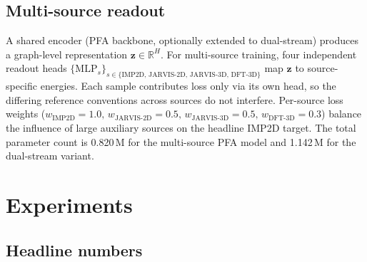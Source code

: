 \documentclass[11pt,a4paper]{article}
\begin{document}
\subsection{Multi-source readout}
A shared encoder (PFA backbone, optionally extended to dual-stream)
produces a graph-level representation $\mathbf{z} \in \mathbb{R}^H$.
For multi-source training, four independent readout heads
$\{\mathrm{MLP}_s\}_{s \in \{\mathrm{IMP2D,\, JARVIS\text{-}2D,\,
JARVIS\text{-}3D,\, DFT\text{-}3D}\}}$ map $\mathbf{z}$ to
source-specific energies. Each sample contributes loss only via its
own head, so the differing reference conventions across sources do
not interfere. Per-source loss weights
($w_{\mathrm{IMP2D}} = 1.0,\, w_{\mathrm{JARVIS\text{-}2D}} = 0.5,\,
w_{\mathrm{JARVIS\text{-}3D}} = 0.5,\,
w_{\mathrm{DFT\text{-}3D}} = 0.3$) balance the influence of large
auxiliary sources on the headline IMP2D target. The total parameter
count is 0.820\,M for the multi-source PFA model and 1.142\,M for
the dual-stream variant.

\section{Experiments}\label{sec:exp}

\subsection{Headline numbers}\label{sec:headline}
\end{document}
